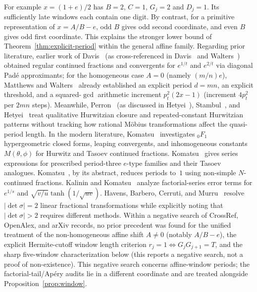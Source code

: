 \documentclass[11pt]{amsart}
\theoremstyle{definition}
\theoremstyle{remark}
\numberwithin{equation}{section}
\begin{document}
For example $x=(1+e)/2$ has $B=2$, $C=1$, $G_j=2$ and $D_j=1$.
Its sufficiently late windows each contain one digit. By contrast,
for a primitive representation of $x=A/B-e$, odd $B$ gives odd
second coordinate, and even $B$ gives odd first coordinate. This
explains the stronger lower bound of Theorem~\ref{thm:explicit-period}
within the general affine family. Regarding prior literature,
earlier work of Davis~\cite{Davis1945} (as cross-referenced in
Davis~\cite{Davis1978} and Walters~\cite{Walters1968}) obtained regular
continued fractions and convergents for $e^{1/t}$ and $e^{2/t}$ via
diagonal Pad\'e approximants; for the homogeneous case $A=0$ (namely
$(m/n)e$), Matthews and Walters~\cite[Theorem~1(b)]{MatthewsWalters1970}
already established an explicit period $d=mn$, an explicit threshold,
and a squared-$\gcd$ arithmetic increment $p_t^2(2x-1)$ (increment
$4p_t^2$ per $2mn$ steps). Meanwhile, Perron~\cite[Band~I, \S33, beginning on p.~119]{Perron1954}
(as discussed in Hetyei~\cite[\S1.2, p.~4]{Hetyei2014}), Stambul~\cite{Stambul}, and
Hetyei~\cite{Hetyei2014} treat qualitative Hurwitzian closure and
repeated-constant Hurwitzian patterns without tracking how rational
M\"obius transformations affect the quasi-period length. In the modern
literature, Komatsu~\cite{Komatsu1999JTNB,Komatsu2003Acta,Komatsu2003Tsukuba,Komatsu2007Czech,Komatsu2008Sarajevo}
investigates ${}_0F_1$ hypergeometric closed forms, leaping convergents,
and inhomogeneous constants $M(\theta,\phi)$ for Hurwitz and Tasoev
continued fractions. Komatsu~\cite[Theorems~1--4, pp.~49--50]{Komatsu2005Monatsh}
gives series expressions for prescribed period-three $e$-type families and
their Tasoev analogues. Komatsu~\cite{Komatsu2009JNT}, by its abstract,
reduces periods to~$1$ using non-simple $N$-continued fractions.
Kalinin and Komatsu~\cite{KalininKomatsu2026} analyze factorial-series
error terms for $e^{1/s}$ and $\sqrt{v/u}\tanh(1/\sqrt{uv})$.
Havens, Barbero, Cerruti, and Murru~\cite{HBCM2020} resolve $|\det\sigma|=2$ linear
fractional transformations while explicitly noting that $|\det\sigma|>2$
requires different methods. Within a negative search of CrossRef,
OpenAlex, and arXiv records, no prior precedent was found for the
unified treatment of the non-homogeneous affine shift $A\ne0$ (notably
$A/B-e$), the explicit Hermite-cutoff window length criterion
$r_j=1\iff G_jG_{j+1}=T$, and the sharp five-window characterization
below (this reports a negative search, not a proof of non-existence). This negative search concerns affine-window periods; the factorial-tail/Ap\'ery audits \cite{Yu2026,YuHAL2026} lie in a different coordinate and are treated alongside Proposition~\ref{prop:window}.
\end{document}
